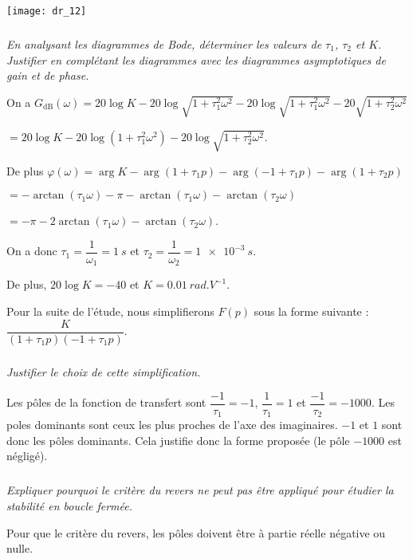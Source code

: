 \begin{multicols}{2}
\begin{center}
\texttt{[image: dr\_12]}
\end{center}
\fi


\subparagraph{} \textit{En analysant les diagrammes de Bode, déterminer les valeurs de $\tau_1$, $\tau_2$ et $K$. Justifier en complétant les diagrammes avec les diagrammes asymptotiques de
gain et de phase.}
\ifprof
\begin{corrige}
On a $G_{\text{dB}}(\omega)=20\log K - 20\log \sqrt{1+\tau_1^2\omega^2} - 20\log \sqrt{1+\tau_1^2\omega^2}-20\sqrt{1+\tau_2^2\omega^2}$ 

$=20\log K - 20\log \left(1+\tau_1^2\omega^2 \right)-20\log\sqrt{1+\tau_2^2\omega^2}$.


De plus $\varphi\left(\omega\right)=\arg K - \arg \left( 1+ \tau_1p\right)- \arg \left( -1+ \tau_1p\right)- \arg \left( 1+ \tau_2p\right)$ 

$= -\arctan\left( \tau_1 \omega\right)-\pi -\arctan\left( \tau_1 \omega\right)-\arctan\left( \tau_2 \omega\right)$

 $= -\pi-2\arctan\left( \tau_1 \omega\right)-\arctan\left( \tau_2 \omega\right)$.
 
 On a donc $\tau_1 = \dfrac{1}{\omega_1} = \SI{1}{s}$ et $\tau_2 = \dfrac{1}{\omega_2} = \SI{1e-3}{s}$.
 
 De plus, $20\log K=-40$ et $K=\SI{0,01}{rad.V^{-1}}$.
\end{corrige}
\else
\fi

\ifprof
\else
Pour la suite de l'étude, nous simplifierons $F(p)$ sous la forme suivante : $\dfrac{K}{(1+\tau_1p)(-1+ \tau_1p)}$.
\fi



\subparagraph{} \textit{Justifier le choix de cette simplification.}
\ifprof
\begin{corrige}
Les pôles de la fonction de transfert sont $\dfrac{-1}{\tau_1}=-1$, $\dfrac{1}{\tau_1}=1$ et $\dfrac{-1}{\tau_2}=-1000$. Les poles dominants sont ceux les plus proches de l'axe des imaginaires. $-1$ et $1$ sont donc les pôles dominants. Cela justifie donc la forme proposée (le pôle $-1000$ est négligé).
\end{corrige}
\else
\fi


\subparagraph{} \textit{Expliquer pourquoi le critère du revers ne peut pas être appliqué pour étudier la stabilité en boucle
fermée.}
\ifprof
\begin{corrige}
Pour que le critère du revers, les pôles doivent être à partie réelle négative ou nulle. 
\end{corrige}
\else
\fi



\end{multicols}
